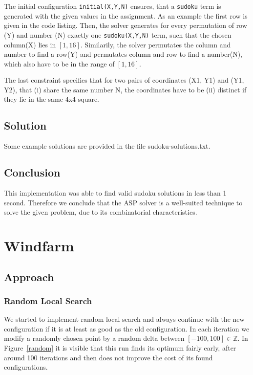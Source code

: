\documentclass{article}
\begin{document}
The initial configuration \texttt{initial(X,Y,N)} ensures, that a \texttt{sudoku} term is generated with the given values in the assignment. As an example the first row is given in the code listing.
Then, the solver generates for every permutation of row (Y) and number (N) exactly one \texttt{sudoku(X,Y,N)} term, such that the chosen column(X) lies in $[1, 16]$.
Similarily, the solver permutates the column and number to find a row(Y) and permutates column and row to find a number(N), which also have to be in the range of $[1, 16]$.

The last constraint specifies that for two pairs of coordinates (X1, Y1) and (Y1, Y2), that (i) share the same number N, the coordinates have to be (ii) distinct if they lie in the same 4x4 square.

\subsection{Solution}
Some example solutions are provided in the file sudoku-solutions.txt.

\subsection{Conclusion}
This implementation was able to find valid sudoku solutions in less than 1 second. Therefore we conclude that the ASP solver is a well-suited technique to solve the given problem, due to its combinatorial characteristics.


\clearpage
\section{Windfarm}


\subsection{Approach}
\subsubsection{Random Local Search}
We started to implement random local search and always continue with the new configuration if it is at least as good as the old configuration. In each iteration we modify a randomly chosen point by a random delta between $[-100,100] \in \mathbb{Z}$. In Figure~\ref{random} it is visible that this run finds its optimum fairly early, after around 100 iterations and then does not improve the cost of its found configurations.
\end{document}
